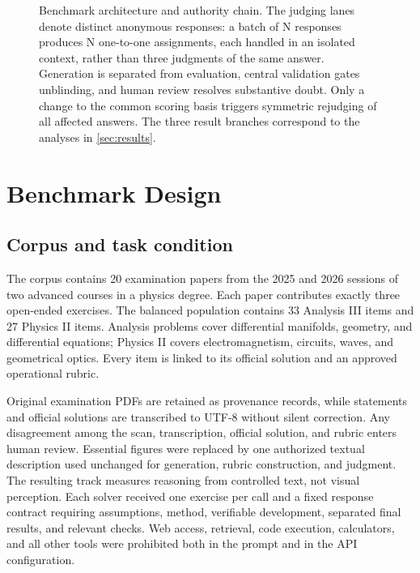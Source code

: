 \documentclass[11pt,a4paper,twocolumn]{article}
\begin{document}
\begin{figure}[!t]
\centering
\resizebox{0.96\textwidth}{!}{}
\caption{Benchmark architecture and authority chain. The judging lanes denote
distinct anonymous responses: a batch of N responses produces N
one-to-one assignments, each handled in an isolated context, rather than three
judgments of the same answer. Generation is separated from evaluation, central
validation gates unblinding, and human review resolves substantive doubt. Only
a change to the common scoring basis triggers symmetric rejudging of all
affected answers. The three result branches correspond to the analyses in
\cref{sec:results}.}
\label{fig:architecture}
\end{figure}

\section{Benchmark Design}

\subsection{Corpus and task condition}

The corpus contains 20 examination papers from the 2025 and 2026 sessions of
two advanced courses in a physics degree. Each paper contributes exactly three
open-ended exercises. The balanced population contains 33 Analysis III items
and 27 Physics II items. Analysis problems cover differential manifolds,
geometry, and differential equations; Physics II covers electromagnetism,
circuits, waves, and geometrical optics. Every item is linked to its official
solution and an approved operational rubric.

Original examination PDFs are retained as provenance records, while statements
and official solutions are transcribed to UTF-8 without silent correction.
Any disagreement among the scan, transcription, official solution, and rubric
enters human review. Essential figures were replaced by one authorized textual
description used unchanged for generation, rubric construction, and judgment. The resulting
track measures reasoning from controlled text, not visual perception. Each
solver received one exercise per call and a fixed response contract requiring
assumptions, method, verifiable development, separated final results, and
relevant checks. Web access, retrieval, code execution, calculators, and all
other tools were prohibited both in the prompt and in the API configuration.
\end{document}

